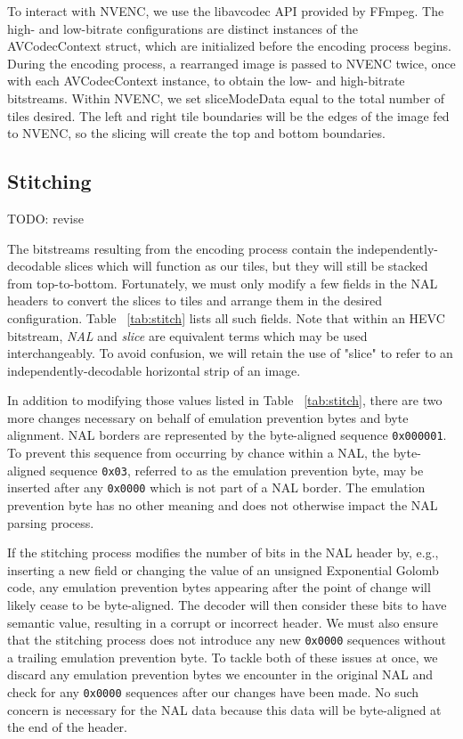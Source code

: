 To interact with NVENC, we use the libavcodec API provided by FFmpeg. The high- and low-bitrate configurations are distinct instances of the AVCodecContext struct, which are initialized before the encoding process begins. During the encoding process, a rearranged image is passed to NVENC twice, once with each AVCodecContext instance, to obtain the low- and high-bitrate bitstreams. Within NVENC, we set sliceModeData equal to the total number of tiles desired. The left and right tile boundaries will be the edges of the image fed to NVENC, so the slicing will create the top and bottom boundaries.

\subsection{Stitching}

TODO: revise

The bitstreams resulting from the encoding process contain the independently-decodable slices which will function as our tiles, but they will still be stacked from top-to-bottom. Fortunately, we must only modify a few fields in the NAL headers to convert the slices to tiles and arrange them in the desired configuration. Table ~\ref{tab:stitch} lists all such fields. Note that within an HEVC bitstream, \textit{NAL} and \textit{slice} are equivalent terms which may be used interchangeably. To avoid confusion, we will retain the use of "slice" to refer to an independently-decodable horizontal strip of an image.

In addition to modifying those values listed in Table ~\ref{tab:stitch}, there are two more changes necessary on behalf of emulation prevention bytes and byte alignment. NAL borders are represented by the byte-aligned sequence \texttt{0x000001}. To prevent this sequence from occurring by chance within a NAL, the byte-aligned sequence \texttt{0x03}, referred to as the emulation prevention byte, may be inserted after any \texttt{0x0000} which is not part of a NAL border. The emulation prevention byte has no other meaning and does not otherwise impact the NAL parsing process.

If the stitching process modifies the number of bits in the NAL header by, e.g., inserting a new field or changing the value of an unsigned Exponential Golomb code, any emulation prevention bytes appearing after the point of change will likely cease to be byte-aligned. The decoder will then consider these bits to have semantic value, resulting in a corrupt or incorrect header. We must also ensure that the stitching process does not introduce any new \texttt{0x0000} sequences without a trailing emulation prevention byte. To tackle both of these issues at once, we discard any emulation prevention bytes we encounter in the original NAL and check for any \texttt{0x0000} sequences after our changes have been made. No such concern is necessary for the NAL data because this data will be byte-aligned at the end of the header.

